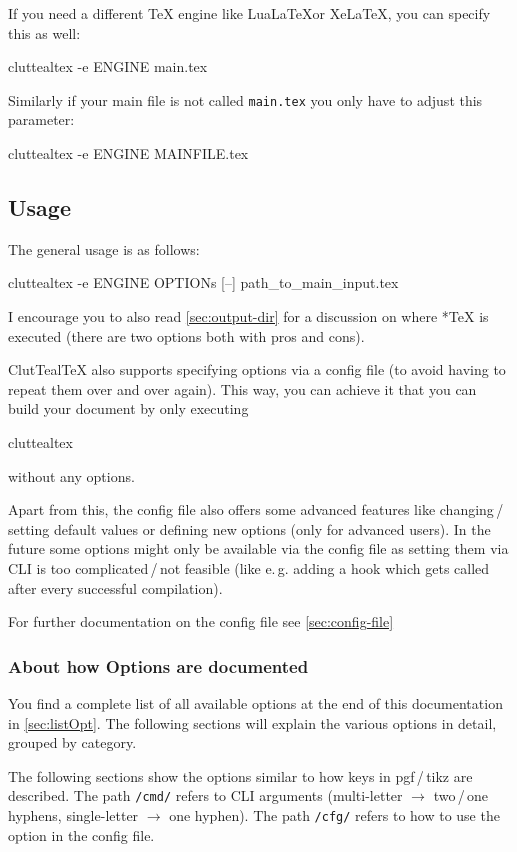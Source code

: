 \documentclass[a4paper, 11pt]{scrartcl}
\newcommand\eg{e.\,g.\xspace}
\newcommand\tos{$\to$\xspace}
\let\TeXold\TeX
\newcommand\CluttealTeX{ClutTeal\TeX\xspace}
\renewcommand\TeX{\TeXold\xspace}
\begin{document}
If you need a different \TeX engine like Lua\LaTeX or Xe\LaTeX, you can specify this as well:
\begin{boxcmd}
  cluttealtex -e ENGINE main.tex
\end{boxcmd}

Similarly if your main file is not called \texttt{main.tex} you only have to adjust this parameter:
\begin{boxcmd}
  cluttealtex -e ENGINE MAINFILE.tex
\end{boxcmd}

\subsection{Usage}
The general usage is as follows:
\begin{boxcmd}
  cluttealtex -e ENGINE OPTIONs [--] path\_to\_main\_input.tex
\end{boxcmd}

I encourage you to also read \cref{sec:output-dir} for a discussion on where *\TeX is executed (there are two options both with pros and cons).

\CluttealTeX also supports specifying options via a config file (to avoid having to repeat them over and over again).
This way, you can achieve it that you can build your document by only executing
\begin{boxcmd}
	cluttealtex
\end{boxcmd}
without any options.

Apart from this, the config file also offers some advanced features like changing\,/\,setting default values or defining new options (only for advanced users).
In the future some options might only be available via the config file as setting them via CLI is too complicated\,/\,not feasible (like \eg adding a hook which gets called after every successful compilation).

For further documentation on the config file see \cref{sec:config-file}

\subsubsection{About how Options are documented} \label{sec:opt-doc}

You find a complete list of all available options at the end of this documentation in \cref{sec:listOpt}.
The following sections will explain the various options in detail, grouped by category.

The following sections show the options similar to how keys in pgf\,/\,tikz are described.
The path \texttt{/cmd/} refers to CLI arguments (multi-letter \tos two\,/\,one hyphens, single-letter \tos one hyphen).
The path \texttt{/cfg/} refers to how to use the option in the config file.
\end{document}
